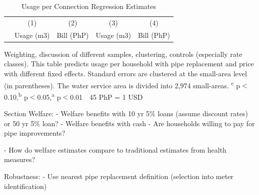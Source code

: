 \documentclass[12pt,table]{article}
\newcommand{\regtext}{
Standard errors are clustered at the small-area level (in parentheses).  The water service area is divided into 2,974 small-areas.
\textsuperscript{c} p$<$0.10,\textsuperscript{b} p$<$0.05,\textsuperscript{a} p$<$0.01 \,\,
}
\begin{document}
\begin{table}[h!] 
\centering
\caption{Usage per Connection Regression Estimates}\label{table:profitregs}
\vspace{-2mm}
\begin{threeparttable}
\begin{tabular}{@{}l*{1}{cccc}@{}}
\toprule
  & (1) & (2) & (3) & (4)  \\
  & Usage (m3) & Bill (PhP) & Usage (m3) & Bill (PhP) \\
\midrule

\bottomrule
\end{tabular}
\begin{tablenotes}
\footnotesize
\item Weighting, discussion of different samples, clustering, controls (especially rate classes).  This table predicts usage per household with pipe replacement and price with different fixed effects.   \regtext 45 PhP = 1 USD \,\,
\end{tablenotes}
\end{threeparttable}
\end{table}










Section Welfare:
	- Welfare benefits with 10 yr 5\% loans (assume discount rates) or 50 yr 5\% loan?
	- Welfare benefits with cash
	- Are households willing to pay for pipe improvements?

	- How do welfare estimates compare to traditional estimates from health measures?

Robustness:
	- Use nearest pipe replacement definition (selection into meter identification)



\end{document}
